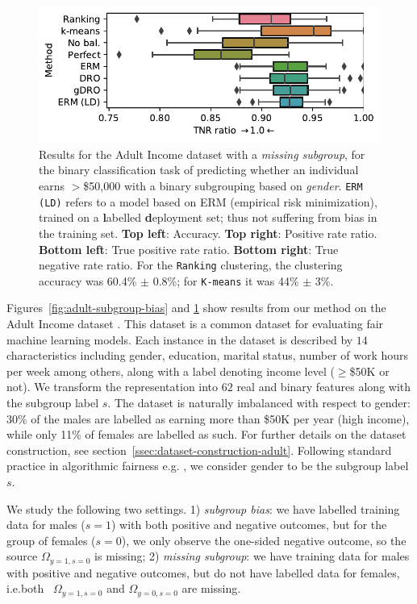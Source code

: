 \begin{figure}[p]
    \includegraphics[width=\columnwidth]{figures/adult_miss_s_tnrr.pdf}
    \caption{%
    Results for the Adult Income dataset with a \emph{missing subgroup},
    for the binary classification task of predicting whether an individual earns $>$\$50,000 with a binary subgrouping based on \emph{gender}.
    \texttt{ERM (LD)} refers to a model based on ERM (empirical risk minimization),
    trained on a \textbf{l}abelled \textbf{d}eployment set; thus not suffering from bias in the training set.
    \textbf{Top left}: Accuracy.
    \textbf{Top right}: Positive rate ratio.
    \textbf{Bottom left}: True positive rate ratio.
    \textbf{Bottom right}: True negative rate ratio.
    For the \texttt{Ranking} clustering, the clustering accuracy was 60.4\% $\pm$ 0.8\%;
    for \texttt{K-means} it was 44\% $\pm$ 3\%.
    }%
    \label{fig:adult-missing-subgroup}
\end{figure}
Figures~\ref{fig:adult-subgroup-bias} and \ref{fig:adult-missing-subgroup} show results from our method on the Adult Income dataset \cite{Dua:2017}.
This dataset is a common dataset for evaluating fair machine learning models. 
Each instance in the dataset is described by $14$ characteristics including gender, education, marital status, number of work hours per week among others, along with a label denoting income level ($\geq$\$50K or not). 
We transform the representation into $62$ real and binary features along with the subgroup label $s$. %
The dataset is naturally imbalanced with respect to gender: 30\% of the males are labelled as earning more than \$50K per year (high income), while only 11\% of females are labelled as such.
For further details on the dataset construction, see section~\ref{ssec:dataset-construction-adult}.
%
Following standard practice in algorithmic fairness  e.g. \citet{ZemeWuSwePitetal13}, we consider gender to be the subgroup label $s$.

We study the following two settings.
1) \emph{subgroup bias}: we have labelled training data for males ($s=1$) with both positive and negative outcomes, but for the group of females ($s=0$), we only observe the one-sided negative outcome, so the source $\Omega_{y=1,s=0}$ is missing;
2) \emph{missing subgroup}: we have training data for males with positive and negative outcomes, but do not have labelled data for females, i.e.both \ $\Omega_{y=1,s=0}$ and $\Omega_{y=0,s=0}$ are missing.

